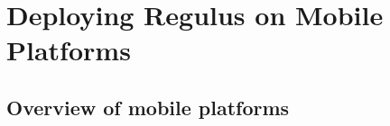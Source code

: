 \chapter{Deploying Regulus on Mobile Platforms}
\label{Chapter:Mobile}

\author{Nikos Tsourakis}

\section{Overview of mobile platforms}
\label{Section:MobileOverview}


